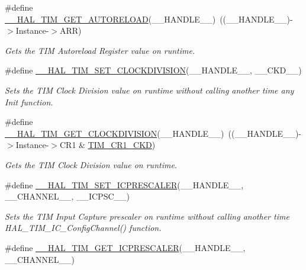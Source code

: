 \begin{DoxyCompactItemize}
\#define \mbox{\hyperlink{group___t_i_m___exported___macros_gaa7a5c7645695bad15bacd402513a028a}{\+\_\+\+\_\+\+H\+A\+L\+\_\+\+T\+I\+M\+\_\+\+G\+E\+T\+\_\+\+A\+U\+T\+O\+R\+E\+L\+O\+AD}}(\+\_\+\+\_\+\+H\+A\+N\+D\+L\+E\+\_\+\+\_\+)~((\+\_\+\+\_\+\+H\+A\+N\+D\+L\+E\+\_\+\+\_\+)-\/$>$Instance-\/$>$A\+RR)
\begin{DoxyCompactList}\small\item\em Gets the T\+IM Autoreload Register value on runtime. \end{DoxyCompactList}\item 
\#define \mbox{\hyperlink{group___t_i_m___exported___macros_ga8aa84d77c670890408092630f9b2bdc4}{\+\_\+\+\_\+\+H\+A\+L\+\_\+\+T\+I\+M\+\_\+\+S\+E\+T\+\_\+\+C\+L\+O\+C\+K\+D\+I\+V\+I\+S\+I\+ON}}(\+\_\+\+\_\+\+H\+A\+N\+D\+L\+E\+\_\+\+\_\+,  \+\_\+\+\_\+\+C\+K\+D\+\_\+\+\_\+)
\begin{DoxyCompactList}\small\item\em Sets the T\+IM Clock Division value on runtime without calling another time any Init function. \end{DoxyCompactList}\item 
\#define \mbox{\hyperlink{group___t_i_m___exported___macros_gae6bc91bb5940bce52828c690f24001b8}{\+\_\+\+\_\+\+H\+A\+L\+\_\+\+T\+I\+M\+\_\+\+G\+E\+T\+\_\+\+C\+L\+O\+C\+K\+D\+I\+V\+I\+S\+I\+ON}}(\+\_\+\+\_\+\+H\+A\+N\+D\+L\+E\+\_\+\+\_\+)~((\+\_\+\+\_\+\+H\+A\+N\+D\+L\+E\+\_\+\+\_\+)-\/$>$Instance-\/$>$C\+R1 \& \mbox{\hyperlink{group___peripheral___registers___bits___definition_gacacc4ff7e5b75fd2e4e6b672ccd33a72}{T\+I\+M\+\_\+\+C\+R1\+\_\+\+C\+KD}})
\begin{DoxyCompactList}\small\item\em Gets the T\+IM Clock Division value on runtime. \end{DoxyCompactList}\item 
\#define \mbox{\hyperlink{group___t_i_m___exported___macros_gaeb106399b95ef02cec502f58276a0e92}{\+\_\+\+\_\+\+H\+A\+L\+\_\+\+T\+I\+M\+\_\+\+S\+E\+T\+\_\+\+I\+C\+P\+R\+E\+S\+C\+A\+L\+ER}}(\+\_\+\+\_\+\+H\+A\+N\+D\+L\+E\+\_\+\+\_\+,  \+\_\+\+\_\+\+C\+H\+A\+N\+N\+E\+L\+\_\+\+\_\+,  \+\_\+\+\_\+\+I\+C\+P\+S\+C\+\_\+\+\_\+)
\begin{DoxyCompactList}\small\item\em Sets the T\+IM Input Capture prescaler on runtime without calling another time H\+A\+L\+\_\+\+T\+I\+M\+\_\+\+I\+C\+\_\+\+Config\+Channel() function. \end{DoxyCompactList}\item 
\#define \mbox{\hyperlink{group___t_i_m___exported___macros_gabfeec6b3c67a5747c7dbd20aff61d8e2}{\+\_\+\+\_\+\+H\+A\+L\+\_\+\+T\+I\+M\+\_\+\+G\+E\+T\+\_\+\+I\+C\+P\+R\+E\+S\+C\+A\+L\+ER}}(\+\_\+\+\_\+\+H\+A\+N\+D\+L\+E\+\_\+\+\_\+,  \+\_\+\+\_\+\+C\+H\+A\+N\+N\+E\+L\+\_\+\+\_\+)

\end{DoxyCompactItemize}
